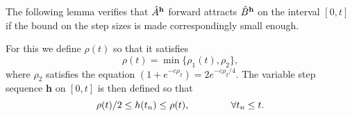 The following lemma verifies that $\hat{A}^{{\bf h}}$ forward attracts
$\hat{B}^{{\bf h}}$ on the interval $[0, t]$ if the bound on the step sizes is
made correspondingly small enough.

For this we define $\rho(t)$ so that it satisfies
\begin{equation} \label{eqrbnd}
  \rho(t) = \min \{\rho_1(t), \rho_2 \},
\end{equation}
where $\rho_2$ satisfies the equation $(1 + e^{-c\rho_2}) = 2 e^{-c\rho_2 /4}$.
The variable step sequence {\bf h} on $[0,t]$  is then defined so that
\begin{equation} \label{hsteps2}
  \rho(t)/2 \leq h(t_n) \leq \rho(t), \hspace{1.5cm} \forall t_n \leq t.
\end{equation}

